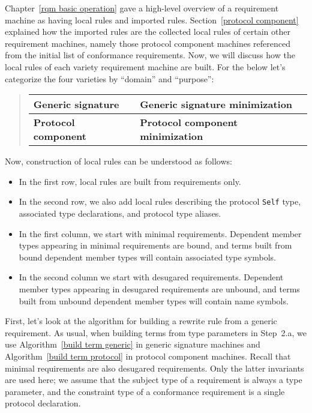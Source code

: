 \documentclass[../generics]{subfiles}
\begin{document}
Chapter~\ref{rqm basic operation} gave a high-level overview of a requirement machine as having local rules and imported rules. Section~\ref{protocol component} explained how the imported rules are the collected local rules of certain other requirement machines, namely those protocol component machines referenced from the initial list of conformance requirements. Now, we will discuss how the local rules of each variety requirement machine are built. For the below let's categorize the four varieties by ``domain'' and ``purpose'':
\begin{quote}
\begin{tabular}{|l|l|}
\hline
\textbf{Generic signature}&\textbf{Generic signature minimization}\\
\hline
\textbf{Protocol component}&\textbf{Protocol component minimization}\\
\hline
\end{tabular}
\end{quote}
Now, construction of local rules can be understood as follows:
\begin{itemize}
\item In the first row, local rules are built from requirements only.

%
\item In the second row, we also add local rules describing the protocol \texttt{Self} type, associated type declarations, and protocol type aliases.

%
%
\item In the first column, we start with minimal requirements. Dependent member types appearing in minimal requirements are bound, and terms built from bound dependent member types will contain associated type symbols.

%
%
\item In the second column we start with desugared requirements. Dependent member types appearing in desugared requirements are unbound, and terms built from unbound dependent member types will contain name symbols.
\end{itemize}
First, let's look at the algorithm for building a rewrite rule from a generic requirement. As usual, when building terms from type parameters in Step~2.a, we use Algorithm~\ref{build term generic} in generic signature machines and Algorithm~\ref{build term protocol} in protocol component machines. Recall that minimal requirements are also desugared requirements. Only the latter invariants are used here; we assume that the subject type of a requirement is always a type parameter, and the constraint type of a conformance requirement is a single protocol declaration.
\end{document}
